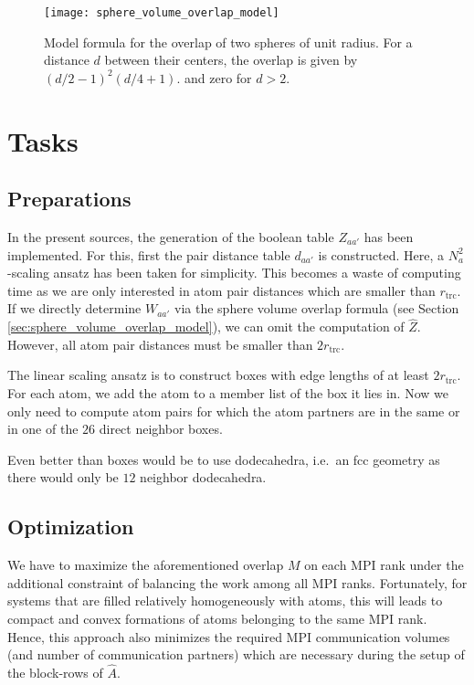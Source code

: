\documentclass[a4paper]{article}
\newcommand{\MPIrank}{MPI rank} %
\newcommand{\um}[1]{_{\mathrm{#1}}}
\begin{document}
\begin{figure}[h!]
\begin{center}
  \texttt{[image: sphere\_volume\_overlap\_model]}
  \caption{Model formula for the overlap of two spheres of unit radius. 
  For a distance $d$ between their centers, the overlap is given by $(d/2 - 1)^2 (d/4 + 1)$.
  and zero for $d > 2$.}
\end{center}
\label{fig:sphere_volume_overlap_model}
\end{figure}

\section{Tasks} \label{sec:tasks}

\subsection{Preparations} \label{sec:tasks_preparations}

In the present sources, the generation of the boolean table $Z_{aa'}$
has been implemented. For this, first the pair distance table $d_{aa'}$ is constructed.
Here, a $N_a^2$-scaling ansatz has been taken for simplicity.
This becomes a waste of computing time as we are only interested in atom pair distances
which are smaller than $r\um{trc}$.
If we directly determine $W_{aa'}$ via the sphere volume overlap formula (see Section \ref{sec:sphere_volume_overlap_model}), 
we can omit the computation of $\hat Z$.
However, all atom pair distances must be smaller than $2r\um{trc}$.

The linear scaling ansatz is to construct boxes with edge lengths of at least $2r\um{trc}$.
For each atom, we add the atom to a member list of the box it lies in.
Now we only need to compute atom pairs for which the atom partners are in the same or 
in one of the $26$ direct neighbor boxes.

Even better than boxes would be to use dodecahedra, 
i.e.~an fcc geometry as there would only be $12$ neighbor dodecahedra.

\subsection{Optimization} \label{sec:tasks_optimization}

We have to maximize the aforementioned overlap $M$ on each \MPIrank{}
under the additional constraint of balancing the work among all \MPIrank{}s.
Fortunately, for systems that are filled relatively homogeneously with atoms,
this will leads to compact and convex formations of atoms belonging to the same \MPIrank{}.
Hence, this approach also minimizes the required MPI communication volumes
(and number of communication partners)
which are necessary during the setup of the block-rows of $\hat A$.
\end{document}
